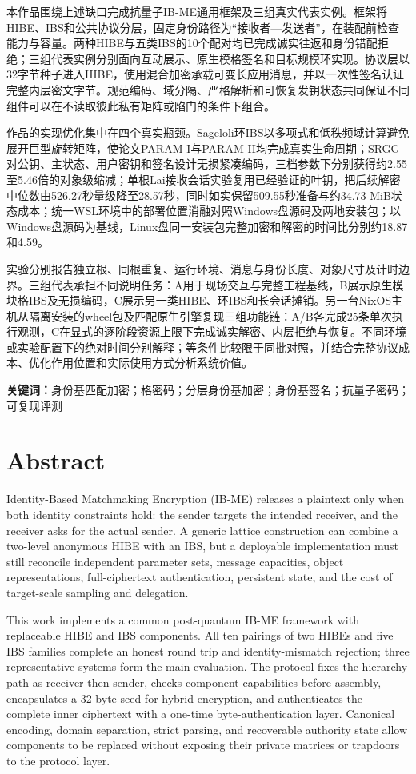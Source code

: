 \documentclass[UTF8,a4paper,12pt,oneside,openany,fontset=fandol]{ctexrep}
\begin{document}
本作品围绕上述缺口完成抗量子IB-ME通用框架及三组真实代表实例。框架将HIBE、IBS和公共协议分层，固定身份路径为“接收者—发送者”，在装配前检查能力与容量。两种HIBE与五类IBS的10个配对均已完成诚实往返和身份错配拒绝；三组代表实例分别面向互动展示、原生模格签名和目标规模环实现。协议层以32字节种子进入HIBE，使用混合加密承载可变长应用消息，并以一次性签名认证完整内层密文字节。规范编码、域分隔、严格解析和可恢复发钥状态共同保证不同组件可以在不读取彼此私有矩阵或陷门的条件下组合。

作品的实现优化集中在四个真实瓶颈。Sageloli环IBS以多项式和低秩频域计算避免展开巨型旋转矩阵，使论文PARAM-I与PARAM-II均完成真实生命周期；SRGG对公钥、主状态、用户密钥和签名设计无损紧凑编码，三档参数下分别获得约2.55至5.46倍的对象级缩减；单根Lai接收会话实验复用已经验证的叶钥，把后续解密中位数由526.27秒量级降至28.57秒，同时如实保留509.55秒准备与约34.73 MiB状态成本；统一WSL环境中的部署位置消融对照Windows盘源码及两地安装包；以Windows盘源码为基线，Linux盘同一安装包完整加密和解密的时间比分别约18.87和4.59。

实验分别报告独立根、同根重复、运行环境、消息与身份长度、对象尺寸及计时边界。三组代表承担不同说明任务：A用于现场交互与完整工程基线，B展示原生模块格IBS及无损编码，C展示另一类HIBE、环IBS和长会话摊销。另一台NixOS主机从隔离安装的wheel包及匹配原生引擎复现三组功能链：A/B各完成25条单次执行观测，C在显式的逐阶段资源上限下完成诚实解密、内层拒绝与恢复。不同环境或实验配置下的绝对时间分别解释；等条件比较限于同批对照，并结合完整协议成本、优化作用位置和实际使用方式分析系统价值。

\noindent\textbf{关键词：}身份基匹配加密；格密码；分层身份基加密；身份基签名；抗量子密码；可复现评测

\clearpage
\chapter*{Abstract}
\begingroup
\linespread{1.15}\selectfont
Identity-Based Matchmaking Encryption (IB-ME) releases a plaintext only when both identity constraints hold: the sender targets the intended receiver, and the receiver asks for the actual sender. A generic lattice construction can combine a two-level anonymous HIBE with an IBS, but a deployable implementation must still reconcile independent parameter sets, message capacities, object representations, full-ciphertext authentication, persistent state, and the cost of target-scale sampling and delegation.

This work implements a common post-quantum IB-ME framework with replaceable HIBE and IBS components. All ten pairings of two HIBEs and five IBS families complete an honest round trip and identity-mismatch rejection; three representative systems form the main evaluation. The protocol fixes the hierarchy path as receiver then sender, checks component capabilities before assembly, encapsulates a 32-byte seed for hybrid encryption, and authenticates the complete inner ciphertext with a one-time byte-authentication layer. Canonical encoding, domain separation, strict parsing, and recoverable authority state allow components to be replaced without exposing their private matrices or trapdoors to the protocol layer.
\end{document}
